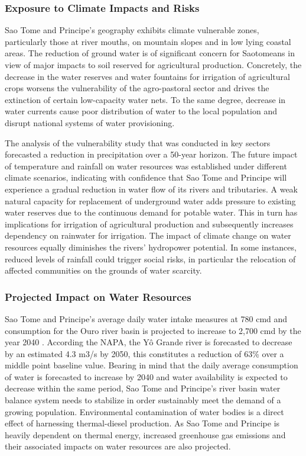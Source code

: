 \documentclass[
]{book}
\begin{document}
\hypertarget{exposure-to-climate-impacts-and-risks-3}{%
\subsubsection{Exposure to Climate Impacts and Risks}\label{exposure-to-climate-impacts-and-risks-3}}

Sao Tome and Principe's geography exhibits climate vulnerable zones, particularly those at river mouths, on mountain slopes and in low lying coastal areas. The reduction of ground water is of significant concern for Saotomeans in view of major impacts to soil reserved for agricultural production. Concretely, the decrease in the water reserves and water fountains for irrigation of agricultural crops worsens the vulnerability of the agro-pastoral sector and drives the extinction of certain low-capacity water nets. To the same degree, decrease in water currents cause poor distribution of water to the local population and disrupt national systems of water provisioning.

The analysis of the vulnerability study that was conducted in key sectors forecasted a reduction in precipitation over a 50-year horizon. The future impact of temperature and rainfall on water resources was established under different climate scenarios, indicating with confidence that Sao Tome and Principe will experience a gradual reduction in water flow of its rivers and tributaries. A weak natural capacity for replacement of underground water adds pressure to existing water reserves due to the continuous demand for potable water. This in turn has implications for irrigation of agricultural production and subsequently increases dependency on rainwater for irrigation. The impact of climate change on water resources equally diminishes the rivers' hydropower potential. In some instances, reduced levels of rainfall could trigger social risks, in particular the relocation of affected communities on the grounds of water scarcity.

\hypertarget{projected-impact-on-water-resources}{%
\subsubsection{Projected Impact on Water Resources}\label{projected-impact-on-water-resources}}

Sao Tome and Principe's average daily water intake measures at 780 cmd and consumption for the Ouro river basin is projected to increase to 2,700 cmd by the year 2040 . According the NAPA, the Yô Grande river is forecasted to decrease by an estimated 4.3 m3/s by 2050, this constitutes a reduction of 63\% over a middle point baseline value. Bearing in mind that the daily average consumption of water is forecasted to increase by 2040 and water availability is expected to decrease within the same period, Sao Tome and Principe's river basin water balance system needs to stabilize in order sustainably meet the demand of a growing population. Environmental contamination of water bodies is a direct effect of harnessing thermal-diesel production. As Sao Tome and Principe is heavily dependent on thermal energy, increased greenhouse gas emissions and their associated impacts on water resources are also projected.
\end{document}
